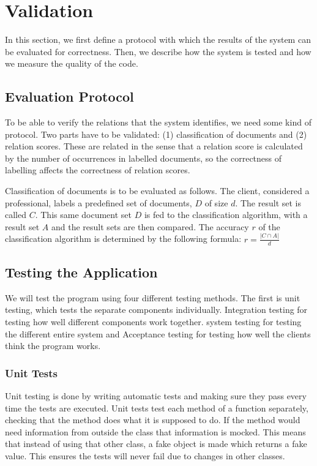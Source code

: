 \section{Validation}
In this section, we first define a protocol with which the results of the system can be evaluated for correctness. Then, we describe how the system is tested and how we measure the quality of the code.

\subsection{Evaluation Protocol}\label{sec:validation_protocol}
To be able to verify the relations that the system identifies, we need some kind of protocol. Two parts have to be validated: (1) classification of documents and (2) relation scores. These are related in the sense that a relation score is calculated by the number of occurrences in labelled documents, so the correctness of labelling affects the correctness of relation scores.

Classification of documents is to be evaluated as follows. The client, considered a professional, labels a predefined set of documents, $D$ of size $d$. The result set is called $C$. This same document set $D$ is fed to the classification algorithm, with a result set $A$ and the result sets are then compared. The accuracy $r$ of the classification algorithm is determined by the following formula: $r = \frac{|C \cap A|}{d}$

\subsection{Testing the Application}
We will test the program using four different testing methods. The first is unit testing, which tests the separate components individually. Integration testing for testing how well different components work together. system testing for testing the different entire system and Acceptance testing for testing how well the clients think the program works.

\subsubsection{Unit Tests}
Unit testing is done by writing automatic tests and making sure they pass every time the tests are executed. Unit tests test each method of a function separately, checking that the method does what it is supposed to do. If the method would need information from outside the class that information is mocked. This means that instead of using that other class, a fake object is made which returns a fake value. This ensures the tests will never fail due to changes in other classes.

